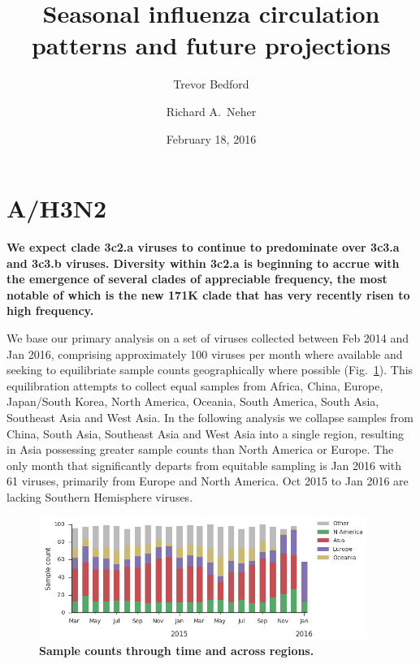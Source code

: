 \documentclass[11pt,oneside,letterpaper]{article}
\title{\vspace{2cm} \Large \bf 
Seasonal influenza circulation patterns and future projections
}
\author[1]{Trevor Bedford}
\author[2]{Richard A.\ Neher}
\affil[1]{Vaccine and Infectious Disease Division, Fred Hutchinson Cancer Research Center, Seattle, WA, USA.}
\affil[2]{Max Planck Institute for Developmental Biology, T\"ubingen, Germany.}
\date{February 18, 2016}
\begin{document}
\maketitle

\tableofcontents

\pagebreak

\section*{A/H3N2}

\textbf{We expect clade 3c2.a viruses to continue to predominate over 3c3.a and 3c3.b viruses. Diversity within 3c2.a is beginning to accrue with the emergence of several clades of appreciable frequency, the most notable of which is the new 171K clade that has very recently risen to high frequency.}

We base our primary analysis on a set of viruses collected between Feb 2014 and Jan 2016, comprising approximately 100 viruses per month where available and seeking to equilibriate sample counts geographically where possible (Fig.\ \ref{H3N2_counts}). This equilibration attempts to collect equal samples from Africa, China, Europe, Japan/South Korea, North America, Oceania, South America, South Asia, Southeast Asia and West Asia. In the following analysis we collapse samples from China, South Asia, Southeast Asia and West Asia into a single region, resulting in Asia possessing greater sample counts than North America or Europe. The only month that significantly departs from equitable sampling is Jan 2016 with 61 viruses, primarily from Europe and North America. Oct 2015 to Jan 2016 are lacking Southern Hemisphere viruses.

\begin{figure}[h!]
	\centering		
	\includegraphics[width=0.95\textwidth]{../figures/feb-2016/H3N2_counts.png}
	\caption{\textbf{Sample counts through time and across regions.} 
	}
	\label{H3N2_counts}
\end{figure}
\end{document}
